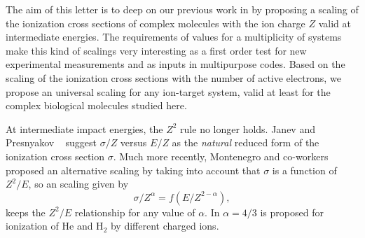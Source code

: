 \documentclass[10pt,showpacs,showkeys,twocolumn]{revtex4}
\begin{document}
The aim of this letter is to deep on our previous work in \cite{MendezJPB20} by proposing a scaling of the ionization cross sections of complex molecules with the ion charge $Z$ valid at intermediate energies.  The requirements of values for a multiplicity of systems make this kind of scalings very interesting as a first order test for new experimental measurements and as inputs in multipurpose codes. Based on the scaling of the ionization cross sections with the number of active electrons, we propose an universal scaling for any ion-target system, valid at least for the complex biological molecules studied here.


At intermediate impact energies, the $Z^2$ rule no longer holds. Janev and Presnyakov ~\cite{janev1980} suggest $\sigma/Z$ versus $E/Z$  as the \textit{natural} reduced form of the ionization cross section $\sigma$. Much more recently, Montenegro and co-workers  ~\cite{dubois13,montenegro_pra13} proposed an alternative scaling  by taking into account that  $\sigma$ is a function of $Z^2/E$, so an scaling given by
\begin{equation}
    \sigma/Z^{\alpha}=f(E/Z^{2-\alpha}),
    \label{Montenegro}
\end{equation}
keeps the $Z^2/E$ relationship for any value of $\alpha$. 
In  \cite{dubois13} $\alpha=4/3$ is proposed for ionization of He and H$_2$ by different charged ions. 
\end{document}
